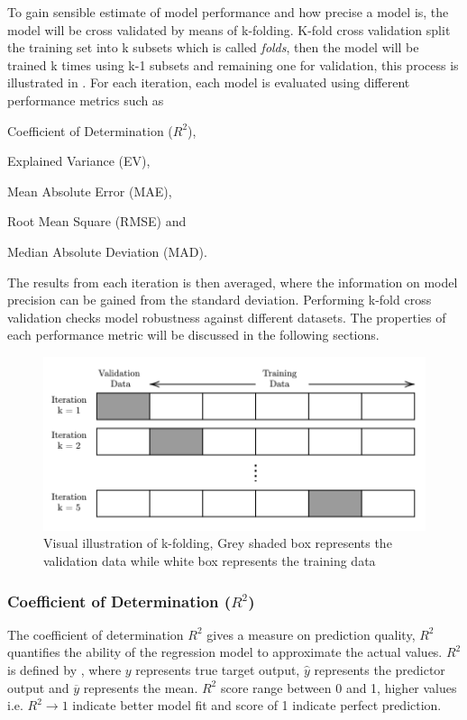 To gain sensible estimate of model performance and how precise a model is, the model will be cross validated by means of k-folding. K-fold cross validation split the training set into k subsets which is called \emph{folds}, then the model will be trained k times using k-1 subsets and remaining one for validation, this process is illustrated in . For each iteration, each model is evaluated using different performance metrics such as \begin{enumerate*}[label={(\arabic*)}]
    \item  Coefficient of Determination ($R^2$), 
    \item Explained Variance (EV), 
    \item Mean Absolute Error (MAE),
    \item Root Mean Square (RMSE) and
    \item Median Absolute Deviation (MAD). 
\end{enumerate*} The results from each iteration is then averaged, where the information on model precision can be gained from the standard deviation. Performing k-fold cross validation checks model robustness against different datasets. The properties of each performance metric will be discussed in the following sections.

\begin{figure}
    \centering
    \includegraphics[width=.85\textwidth]{02_figures/kfold.png}
    \caption{Visual illustration of k-folding, Grey shaded box represents the validation data while white box represents the training data}
    \label{fig:kfold}
\end{figure}

\subsubsection*{Coefficient of Determination ({$R^2$})}\label{sec:rsquared}

The coefficient of determination $R^2$ gives a measure on prediction quality, $R^2$ quantifies the ability of the regression model to approximate the actual values. $R^2 $ is defined by , where $y$ represents true target output, $\hat{y}$ represents the predictor output and $\overline{y}$ represents the mean. $R^2$ score range between 0 and 1, higher values i.e. $R^2 \rightarrow 1$ indicate better model fit and score of 1 indicate perfect prediction.\\


